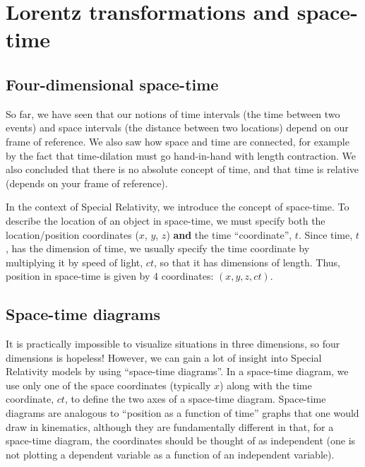\section{Lorentz transformations and space-time}
\subsection{Four-dimensional space-time}
So far, we have seen that our notions of time intervals (the time between two events) and space intervals (the distance between two locations) depend on our frame of reference. We also saw how space and time are connected, for example by the fact that time-dilation must go hand-in-hand with length contraction. We also concluded that there is no absolute concept of time, and that time is relative (depends on your frame of reference). 

In the context of Special Relativity, we introduce the concept of space-time. To describe the location of an object in space-time, we must specify both the location/position coordinates ($x$, $y$, $z$) \textbf{and} the time ``coordinate'', $t$. Since time, $t$, has the dimension of time, we usually specify the time coordinate by multiplying it by speed of light, $ct$, so that it has dimensions of length. Thus, position in space-time is given by 4 coordinates: $(x,y,z,ct)$.

\subsection{Space-time diagrams}
It is practically impossible to visualize situations in three dimensions, so four dimensions is hopeless! However, we can gain a lot of insight into Special Relativity models by using ``space-time diagrams''. In a space-time diagram, we use only one of the space coordinates (typically $x$) along with the time coordinate, $ct$, to define the two axes of a space-time diagram. Space-time diagrams are analogous to ``position as a function of time'' graphs that one would draw in kinematics, although they are fundamentally different in that, for a space-time diagram, the coordinates should be thought of as independent (one is not plotting a dependent variable as a function of an independent variable).

